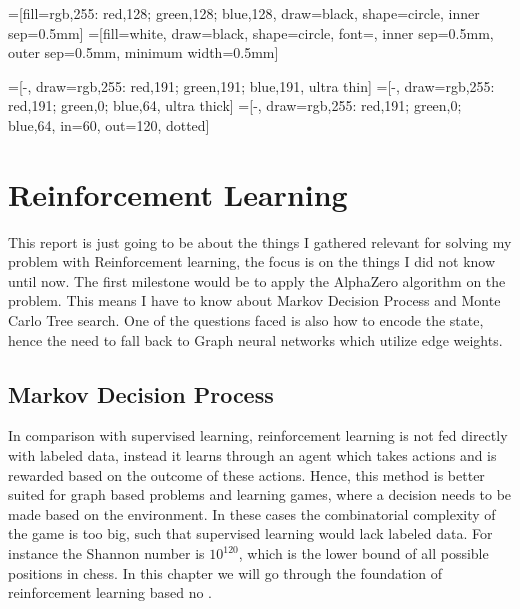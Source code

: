 
\renewcommand{\algorithmicrequire}{\textbf{Input:}}
\renewcommand{\algorithmicensure}{\textbf{Output:}}
=[fill={rgb,255: red,128; green,128; blue,128},
draw=black, shape=circle, inner sep=0.5mm]
=[fill=white, draw=black, shape=circle, font=\scriptsize,
        inner sep=0.5mm, outer sep=0.5mm, minimum width=0.5mm]

=[-, draw={rgb,255: red,191; green,191; blue,191}, ultra thin]
=[-, draw={rgb,255: red,191; green,0; blue,64},
ultra thick]
=[-, draw={rgb,255: red,191; green,0; blue,64}, in=60, out=120, dotted]



\maketitle

\section{Reinforcement Learning}
This report is just going to be about the things I gathered relevant for
solving my problem with Reinforcement learning, the focus is on the things I
did not know until now. The first milestone would be to apply the AlphaZero
algorithm on the problem. This means I have to know about Markov Decision
Process and Monte Carlo Tree search. One of the questions faced is also how
to encode the state, hence the need to fall back to Graph neural networks
which utilize edge weights.
\subsection{Markov Decision Process}
In comparison with supervised learning, reinforcement learning is not fed
directly with labeled data, instead it learns through an agent which takes
actions and is rewarded based on the outcome of these actions. Hence, this
method is better suited for graph based problems and learning games, where a
decision needs to be made based on the environment. In these cases the
combinatorial complexity of the game is too big, such that supervised
learning would lack labeled data. For instance the Shannon number is
$10^{120}$, which is the lower bound of all possible positions in chess.
In this chapter we will go through the foundation of reinforcement learning
based no \cite[Chapter~17]{ml_foundations}.

